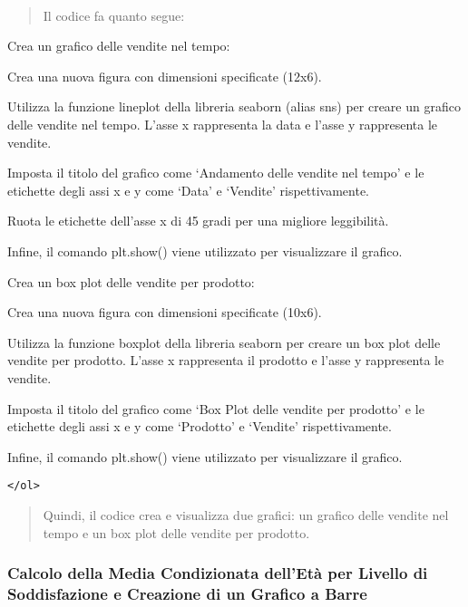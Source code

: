 \documentclass[11pt]{article}
\begin{document}
    \begin{center}
    \end{center}
    { \hspace*{\fill} \\}
    
    \begin{quote}
Il codice fa quanto segue:
\end{quote}

Crea un grafico delle vendite nel tempo:

Crea una nuova figura con dimensioni specificate (12x6).

Utilizza la funzione lineplot della libreria seaborn (alias sns) per
creare un grafico delle vendite nel tempo. L'asse x rappresenta la data
e l'asse y rappresenta le vendite.

Imposta il titolo del grafico come `Andamento delle vendite nel tempo' e
le etichette degli assi x e y come `Data' e `Vendite' rispettivamente.

Ruota le etichette dell'asse x di 45 gradi per una migliore leggibilità.

Infine, il comando plt.show() viene utilizzato per visualizzare il
grafico.

Crea un box plot delle vendite per prodotto:

Crea una nuova figura con dimensioni specificate (10x6).

Utilizza la funzione boxplot della libreria seaborn per creare un box
plot delle vendite per prodotto. L'asse x rappresenta il prodotto e
l'asse y rappresenta le vendite.

Imposta il titolo del grafico come `Box Plot delle vendite per prodotto'
e le etichette degli assi x e y come `Prodotto' e `Vendite'
rispettivamente.

Infine, il comando plt.show() viene utilizzato per visualizzare il
grafico.

\begin{verbatim}
</ol>
\end{verbatim}

\begin{quote}
Quindi, il codice crea e visualizza due grafici: un grafico delle
vendite nel tempo e un box plot delle vendite per prodotto.
\end{quote}

    \subsubsection{Calcolo della Media Condizionata dell'Età per Livello di
Soddisfazione e Creazione di un Grafico a
Barre}\label{calcolo-della-media-condizionata-delletuxe0-per-livello-di-soddisfazione-e-creazione-di-un-grafico-a-barre}
\end{document}
